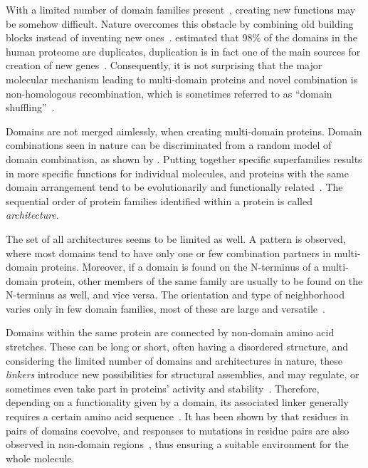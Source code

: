 \label{intro:multi}

  With a limited number of domain families
  present~\cite{chothia1992one, wolf2000estimating}, creating new functions may be somehow
  difficult.
  Nature overcomes this obstacle by combining old building blocks instead of inventing new
  ones~\cite{apic2001insight}.
  \citet{muller2002structural} estimated that 98\% of the domains in the human proteome
  are duplicates, duplication is in fact one of the main sources for creation of new
  genes~\cite{lynch2000evolutionary}.
  Consequently, it is not surprising that the major molecular mechanism leading to
  multi-domain proteins and novel combination is non-homologous recombination, which is
  sometimes referred to as ``domain shuffling''~\cite{vogel2004structure}.

  Domains are not merged aimlessly, when creating multi-domain proteins.
  Domain combinations seen in nature can be discriminated from a random model of domain
  combination, as shown by \citet{apic2003multi}.
  Putting together specific superfamilies results in more specific functions for
  individual molecules, and proteins with the same domain arrangement tend to be
  evolutionarily and functionally
  related~\cite{hegyi2001annotation, bashton2002geometry, vogel2004structure}.
  The sequential order of protein families identified within a protein is called
  \emph{architecture}.

  The set of all architectures seems to be limited as well.
  A pattern is observed, where most domains tend to have only one or few
  combination partners in multi-domain proteins.
  Moreover, if a domain is found on the N-terminus of a multi-domain protein, other
  members of the same family are usually to be found on the N-terminus as well, and vice
  versa.
  The orientation and type of neighborhood varies only in few domain families, most of
  these are large and versatile~\cite{apic2001domain, apic2001insight}.

\label{intro:linker}

  Domains within the same protein are connected by non-domain amino acid stretches.
  These can be long or short, often having a disordered structure, and considering the
  limited number of domains and architectures in nature, these \emph{linkers} introduce
  new possibilities for structural assemblies, and may regulate, or sometimes even take
  part in proteins' activity and stability~\cite{papaleo2016role}.
  Therefore, depending on a functionality given by a domain, its associated linker
  generally requires a certain amino acid sequence~\cite{gokhale2000role}.
  It has been shown by \citet{jakubec2018widespread} that residues in pairs of domains
  coevolve, and responses to mutations in residue pairs are also observed in non-domain
  regions~\cite{smock2010interdomain}, thus ensuring a suitable environment for the whole
  molecule.

